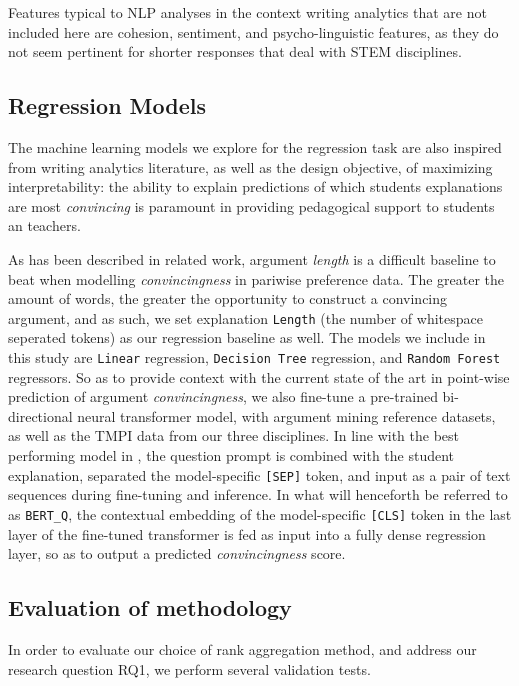 \documentclass[notitlepage,12pt]{jedm}
\begin{document}
Features typical to NLP analyses in the context writing analytics that are not 
included here are cohesion, sentiment, and psycho-linguistic features, as they 
do not seem pertinent for shorter responses that deal with STEM disciplines.

\subsection{Regression Models}

The machine learning models we explore for the regression task are also 
inspired from writing analytics literature, as well as the design objective, of 
maximizing interpretability: the ability to explain predictions of which 
students explanations are most \textit{convincing} is paramount in providing 
pedagogical support to students an teachers.

As has been described in related work, argument \textit{length} is a difficult 
baseline to beat when modelling \textit{convincingness} in pariwise 
preference data.
The greater the amount of words, the greater the opportunity to construct a 
convincing argument, and as such, we set explanation \verb|Length| (the number 
of whitespace seperated tokens) as our regression baseline as well. 
The models we include in this study are \verb|Linear| regression, 
\verb|Decision Tree| regression, and \verb|Random Forest| regressors.
So as to provide context with the current state of the art in point-wise 
prediction of argument \textit{convincingness}, we also fine-tune a pre-trained 
bi-directional neural transformer model, with argument mining reference 
datasets, as well as the TMPI data from our three disciplines. 
In line with the best performing model in \cite{gretz_large-scale_2019}, the 
question prompt is combined with the student explanation, separated the 
model-specific \verb|[SEP]| token, and input as a pair of text sequences during 
fine-tuning and inference. 
In what will henceforth be referred to as \verb|BERT_Q|, the contextual 
embedding of the model-specific \verb|[CLS]| token in the last layer of the 
fine-tuned transformer is fed as input into a fully dense regression layer, so 
as to output a predicted \textit{convincingness} score.

 
\subsection{Evaluation of methodology}\label{sec:methodology_eval}

In order to evaluate our choice of rank aggregation method, and address our 
research question RQ1, we perform several validation tests.
\end{document}
